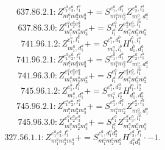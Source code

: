 \documentclass[letterpaper,10pt,fleqn,leqno,onecolumn]{article}
\begin{document}
\begin{equation} \;\;\;\;\;\;  637.86.2.1: Z^{e_{1}^{a}e_{2}^{a},l_{1}^{a}}_{m_{1}^{a}m_{2}^{a}m_{3}^{a}}+=S^{e_{1}^{a},d_{1}^{a}}_{m_{1}^{a}m_{2}^{a}}Z^{e_{2}^{a},l_{1}^{a}}_{m_{3}^{a},d_{1}^{a}} \end{equation}
\begin{equation} \;\;\;\;\;\;  637.86.3.0: Z^{e_{1}^{a}e_{2}^{a}e_{3}^{a}}_{m_{1}^{a}m_{2}^{a}m_{3}^{a}}+=S^{e_{1}^{a}}_{l_{1}^{a}}Z^{e_{2}^{a}e_{3}^{a},l_{1}^{a}}_{m_{1}^{a}m_{2}^{a}m_{3}^{a}} \end{equation}
\begin{equation} \;\;\;\;\;\;  741.96.1.2: Z^{e_{1}^{a},l_{1}^{a}}_{m_{1}^{a},d_{1}^{a}}+=S^{e_{1}^{a},d_{1}^{b}}_{m_{1}^{a},l_{1}^{b}}H^{l_{1}^{b},l_{1}^{a}}_{d_{1}^{b},d_{1}^{a}} \end{equation}
\begin{equation} \;\;\;\;\;\;  741.96.2.1: Z^{e_{1}^{a}e_{2}^{a},l_{1}^{a}}_{m_{1}^{a}m_{2}^{a}m_{3}^{a}}+=S^{e_{1}^{a},d_{1}^{a}}_{m_{1}^{a}m_{2}^{a}}Z^{e_{2}^{a},l_{1}^{a}}_{m_{3}^{a},d_{1}^{a}} \end{equation}
\begin{equation} \;\;\;\;\;\;  741.96.3.0: Z^{e_{1}^{a}e_{2}^{a}e_{3}^{a}}_{m_{1}^{a}m_{2}^{a}m_{3}^{a}}+=S^{e_{1}^{a}}_{l_{1}^{a}}Z^{e_{2}^{a}e_{3}^{a},l_{1}^{a}}_{m_{1}^{a}m_{2}^{a}m_{3}^{a}} \end{equation}
\begin{equation} \;\;\;\;\;\;  745.96.1.2: Z^{e_{1}^{a},l_{1}^{a}}_{m_{1}^{a},d_{1}^{a}}+=S^{e_{1}^{a},d_{2}^{a}}_{m_{1}^{a},l_{2}^{a}}H^{l_{1}^{a},l_{2}^{a}}_{d_{1}^{a},d_{2}^{a}} \end{equation}
\begin{equation} \;\;\;\;\;\;  745.96.2.1: Z^{e_{1}^{a}e_{2}^{a},l_{1}^{a}}_{m_{1}^{a}m_{2}^{a}m_{3}^{a}}+=S^{e_{1}^{a},d_{1}^{a}}_{m_{1}^{a}m_{2}^{a}}Z^{e_{2}^{a},l_{1}^{a}}_{m_{3}^{a},d_{1}^{a}} \end{equation}
\begin{equation} \;\;\;\;\;\;  745.96.3.0: Z^{e_{1}^{a}e_{2}^{a}e_{3}^{a}}_{m_{1}^{a}m_{2}^{a}m_{3}^{a}}+=S^{e_{1}^{a}}_{l_{1}^{a}}Z^{e_{2}^{a}e_{3}^{a},l_{1}^{a}}_{m_{1}^{a}m_{2}^{a}m_{3}^{a}} \end{equation}
\begin{equation} \;\;\;\;\;\;  327.56.1.1: Z^{e_{1}^{a}e_{2}^{a},l_{1}^{a}}_{m_{1}^{a}m_{2}^{a}m_{3}^{a}}+=S^{e_{1}^{a},d_{1}^{a}d_{2}^{a}}_{m_{1}^{a}m_{2}^{a}m_{3}^{a}}H^{e_{2}^{a},l_{1}^{a}}_{d_{1}^{a}d_{2}^{a}}\cdot -1. \end{equation}
\end{document}
